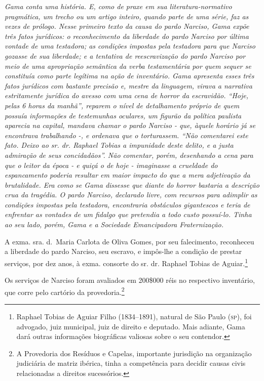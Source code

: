 {\begin{didascalia}
\emph{Gama conta uma história. E, como de praxe em sua
literatura-normativo pragmática, um trecho ou um artigo inteiro, quando
parte de uma série, faz as vezes de prólogo. Nesse primeiro texto da
causa do pardo Narciso, Gama expõe três fatos jurídicos: o
reconhecimento da liberdade do pardo Narciso por última vontade de uma
testadora; as condições impostas pela testadora para que Narciso gozasse
de sua liberdade; e a tentativa de reescravização do pardo Narciso por
meio de uma apropriação semântica da verba testamentária por quem sequer
se constituía como parte legítima na ação de inventário. Gama apresenta
esses três fatos jurídicos com bastante precisão e, mestre da linguagem,
virava a narrativa estritamente jurídica do avesso com uma cena de
horror da escravidão. ``Hoje, pelas 6 horas da manhã'', reparem o nível de
detalhamento próprio de quem possuía informações de testemunhas
oculares, um figurão da política paulista aparecia na capital, mandava
chamar o pardo Narciso - que, àquele horário já se encontrava
trabalhando -, e ordenava que o torturassem. ``Não comentarei este fato.
Deixo ao sr. dr. Raphael Tobias a impunidade deste delito, e a justa
admiração de seus concidadãos''. Não comentar, porém, desenhando a cena
para que o leitor da época - e quiçá o de hoje - imaginasse a crueldade
do espancamento poderia resultar em maior impacto do que a mera
adjetivação da brutalidade. Era como se Gama dissesse que diante do
horror bastaria a descrição crua da tragédia. O pardo Narciso, declarado
livre, com recursos para adimplir as condições impostas pela testadora,
encontraria obstáculos gigantescos e teria de enfrentar as vontades de
um fidalgo que pretendia a todo custo possuí-lo. Tinha ao seu lado,
porém, Gama e a Sociedade Emancipadora Fraternização.}
\end{didascalia}


A exma. sra. d.~Maria Carlota de Oliva Gomes, por seu falecimento,
reconheceu a liberdade do pardo Narciso, seu escravo, e impôs-lhe a
condição de prestar serviços, por dez anos, à exma. consorte do sr. dr.
Raphael Tobias de Aguiar.\footnote{ Raphael Tobias de Aguiar Filho
  (1834--1891), natural de São Paulo (\textsc{sp}), foi advogado, juiz municipal,
  juiz de direito e deputado. Mais adiante, Gama dará outras informações
  biográficas valiosas sobre o seu contendor.}

Os serviços de Narciso foram avaliados em 200\$000 réis no respectivo
inventário, que corre pelo cartório da
provedoria.\footnote{ A Provedoria dos Resíduos e
  Capelas, importante jurisdição na organização judiciária de matriz
  ibérica, tinha a competência para decidir causas civis relacionadas a
  direitos sucessórios.}

}
